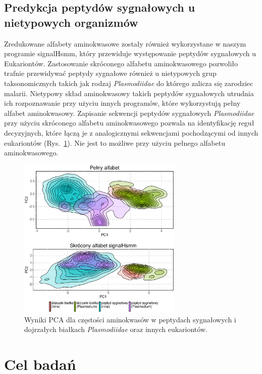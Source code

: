 \documentclass{article}
\begin{document}
\subsection{Predykcja peptydów sygnałowych u nietypowych organizmów}

Zredukowane alfabety aminokwasowe zostały również wykorzystane w 
naszym programie signalHsmm, który przewiduje występowanie peptydów sygnałowych 
u Eukariontów. Zastosowanie skróconego alfabetu aminokwasowego pozwoliło 
trafnie przewidywać peptydy sygnałowe również u nietypowych grup taksonomicznych 
takich jak rodzaj \textit{Plasmodiidae} do którego zalicza się zarodziec 
malarii. Nietypowy skład aminokwasowy takich peptydów sygnałowych utrudnia ich 
rozpoznawanie przy użyciu innych programów, które wykorzystują pełny alfabet 
aminokwasowy. Zapisanie sekwencji peptydów sygnałowych \textit{Plasmodiidae} 
przy użyciu skróconego alfabetu aminokwasowego pozwala na identyfikację reguł 
decyzyjnych, które łączą je z analogicznymi sekwencjami pochodzącymi od innych 
eukariontów (Rys.~\ref{fig:PCA}). Nie jest to możliwe przy użyciu pełnego 
alfabetu aminokwasowego.

\begin{figure}[htbp]
\centering
\includegraphics[width=0.7\textwidth]{signalHsmm.eps}
\caption{Wyniki PCA dla częstości aminokwasów w peptydach sygnałowych i 
dojrzałych białkach \textit{Plasmodiidae} oraz innych eukariontów.}
\label{fig:PCA}
\end{figure}


\section{Cel badań}
\end{document}
